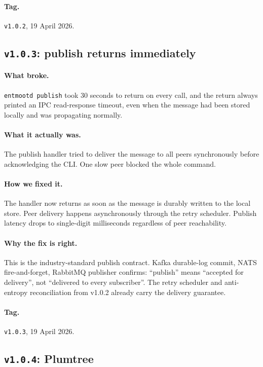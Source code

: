 \documentclass[11pt,a4paper]{article}
\begin{document}
\paragraph*{Tag.} \texttt{v1.0.2}, 19 April 2026.

\subsection{\texttt{v1.0.3}: publish returns immediately}

\paragraph{What broke.} \texttt{entmootd publish} took 30
seconds to return on every call, and the return always printed
an IPC read-response timeout, even when the message had been
stored locally and was propagating normally.

\paragraph{What it actually was.} The publish handler tried to
deliver the message to all peers synchronously before
acknowledging the CLI. One slow peer blocked the whole command.

\paragraph{How we fixed it.} The handler now returns as soon as
the message is durably written to the local store. Peer
delivery happens asynchronously through the retry scheduler.
Publish latency drops to single-digit milliseconds regardless of
peer reachability.

\paragraph{Why the fix is right.} This is the industry-standard
publish contract. Kafka durable-log commit, NATS fire-and-forget,
RabbitMQ publisher confirms: ``publish'' means ``accepted for
delivery'', not ``delivered to every subscriber''. The retry
scheduler and anti-entropy reconciliation from v1.0.2 already
carry the delivery guarantee.

\paragraph*{Tag.} \texttt{v1.0.3}, 19 April 2026.

\subsection{\texttt{v1.0.4}: Plumtree}
\end{document}
